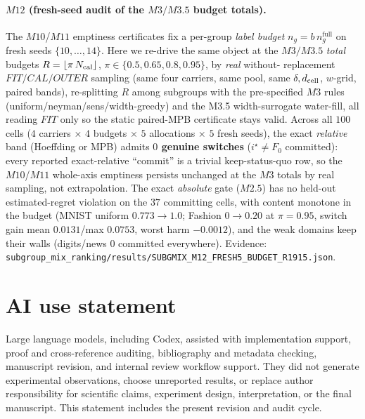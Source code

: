 \documentclass{article}
\begin{document}
\paragraph{$M12$ (fresh-seed audit of the $M3/M3.5$ budget totals).}
The $M10$/$M11$ emptiness certificates fix a per-group \emph{label budget} $n_g=b\,n_g^{\mathrm{full}}$
on fresh seeds $\{10,\dots,14\}$. Here we re-drive the same object at the $M3/M3.5$ \emph{total}
budgets $R=\lfloor\pi\,N_{\rm cal}\rfloor$, $\pi\in\{0.5,0.65,0.8,0.95\}$, by \emph{real} without-
replacement $FIT/CAL/OUTER$ sampling (same four carriers, same pool, same $\delta,d_{\rm cell}$,
$w$-grid, paired bands), re-splitting $R$ among subgroups with the pre-specified $M3$ rules
(uniform/neyman/sens/width-greedy) and the M3.5 width-surrogate water-fill, all reading $FIT$ only so
the static paired-MPB certificate stays valid. Across all $100$ cells
($4$ carriers $\times$ $4$ budgets $\times$ $5$ allocations $\times$ $5$ fresh seeds), the exact
\emph{relative} band (Hoeffding or MPB) admits \textbf{$0$ genuine switches} ($i^\star\!\ne\!F_0$
committed): every reported exact-relative ``commit'' is a trivial keep-status-quo row, so the $M10$/$
M11$ whole-axis emptiness persists unchanged at the $M3$ totals by real sampling, not extrapolation.
The exact \emph{absolute} gate ($M2.5$) has no held-out estimated-regret violation on the $37$ committing cells, with
content monotone in the budget (MNIST uniform $0.773\!\to\!1.0$; Fashion $0\!\to\!0.20$ at $\pi{=}0.95$,
switch gain mean $0.0131$/max $0.0753$, worst harm $-0.0012$), and the weak domains keep their walls
(digits/news $0$ committed everywhere). Evidence:
\texttt{subgroup\_mix\_ranking/results/SUBGMIX\_M12\_FRESH5\_BUDGET\_R1915.json}.

\section{AI use statement}
Large language models, including Codex, assisted with implementation support, proof and
cross-reference auditing, bibliography and metadata checking, manuscript revision, and
internal review workflow support. They did not generate experimental observations, choose
unreported results, or replace author responsibility for scientific claims, experiment design,
interpretation, or the final manuscript. This statement includes the present revision and
audit cycle.
\end{document}
